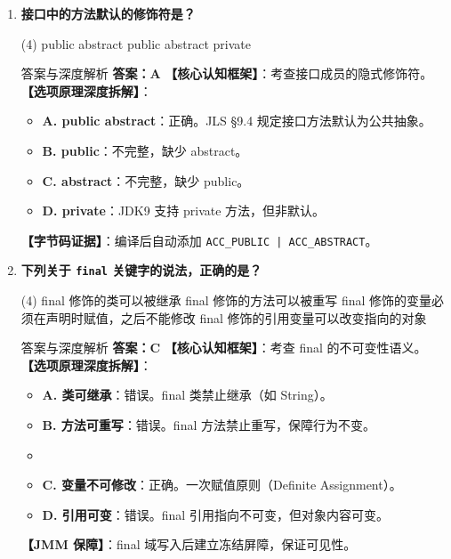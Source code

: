 ﻿\documentclass[12pt, a4paper]{ctexart}
\newcommand{\code}[1]{\texttt{#1}}
\begin{document}
\begin{enumerate}[label=\textbf{\arabic*.}, itemsep=1em]
	\item \textbf{接口中的方法默认的修饰符是？}
	      \begin{tasks}(4)
		      \task public abstract \task public \task abstract \task private
	      \end{tasks}
	      \begin{bluebox}{答案与深度解析}
		      \textbf{答案：A}
		      \textbf{【核心认知框架】}：考查接口成员的隐式修饰符。
		      \textbf{【选项原理深度拆解】}：
		      \begin{itemize}[leftmargin=*, nosep]
			      \item \textbf{A. public abstract}：正确。JLS §9.4 规定接口方法默认为公共抽象。
			      \item \textbf{B. public}：不完整，缺少 abstract。
			      \item \textbf{C. abstract}：不完整，缺少 public。
			      \item \textbf{D. private}：JDK9 支持 private 方法，但非默认。
		      \end{itemize}
		      \textbf{【字节码证据】}：编译后自动添加 \code{ACC\_PUBLIC | ACC\_ABSTRACT}。
	      \end{bluebox}

	\item \textbf{下列关于 \code{final} 关键字的说法，正确的是？}
	      \begin{tasks}(4)
		      \task final 修饰的类可以被继承 \task final 修饰的方法可以被重写
		      \task final 修饰的变量必须在声明时赋值，之后不能修改 \task final 修饰的引用变量可以改变指向的对象
	      \end{tasks}
	      \begin{bluebox}{答案与深度解析}
		      \textbf{答案：C}
		      \textbf{【核心认知框架】}：考查 final 的不可变性语义。
		      \textbf{【选项原理深度拆解】}：
		      \begin{itemize}[leftmargin=*, nosep]
			      \item \textbf{A. 类可继承}：错误。final 类禁止继承（如 String）。
			      \item \textbf{B. 方法可重写}：错误。final 方法禁止重写，保障行为不变。
			      \item \item \textbf{C. 变量不可修改}：正确。一次赋值原则（Definite Assignment）。
			      \item \textbf{D. 引用可变}：错误。final 引用指向不可变，但对象内容可变。
		      \end{itemize}
		      \textbf{【JMM 保障】}：final 域写入后建立冻结屏障，保证可见性。
	      \end{bluebox}


\end{enumerate}
\end{document}
